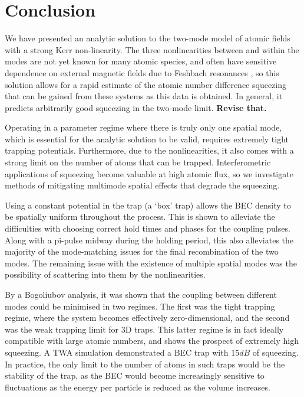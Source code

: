 \documentclass{iopart}
\begin{document}
\section{Conclusion}
\label{sectionConclusion}

We have presented an analytic solution to the two-mode model of atomic fields with a strong Kerr non-linearity.  The three nonlinearities between and within the modes are not yet known for many atomic species, and often have sensitive dependence on external magnetic fields due to Feshbach resonances \cite{FeshbachOrReview}, so this solution allows for a rapid estimate of the atomic number difference squeezing that can be gained from these systems as this data is obtained.  In general, it predicts arbitrarily good squeezing in the two-mode limit. \textbf{Revise that.}

Operating in a parameter regime where there is truly only one spatial mode, which is essential for the analytic solution to be valid, requires extremely tight trapping potentials.  Furthermore, due to the nonlinearities, it also comes with a strong limit on the number of atoms that can be trapped.  Interferometric applications of squeezing become valuable at high atomic flux, so we investigate methods of mitigating multimode spatial effects that degrade the squeezing.

Using a constant potential in the trap (a `box' trap) allows the BEC density to be spatially uniform throughout the process.  This is shown to alleviate the difficulties with choosing correct hold times and phases for the coupling pulses.  Along with a pi-pulse midway during the holding period, this also alleviates the majority of the mode-matching issues for the final recombination of the two modes.  The remaining issue with the existence of multiple spatial modes was the possibility of scattering into them by the nonlinearities.

By a Bogoliubov analysis, it was shown that the coupling between different modes could be minimised in two regimes.  The first was the tight trapping regime, where the system becomes effectively zero-dimensional, and the second was the weak trapping limit for 3D traps.  This latter regime is in fact ideally compatible with large atomic numbers, and shows the prospect of extremely high squeezing.  A TWA simulation demonstrated a BEC trap with $15dB$ of squeezing.  In practice, the only limit to the number of atoms in such traps would be the stability of the trap, as the BEC would become increasingly sensitive to fluctuations as the energy per particle is reduced as the volume increases.
\end{document}
